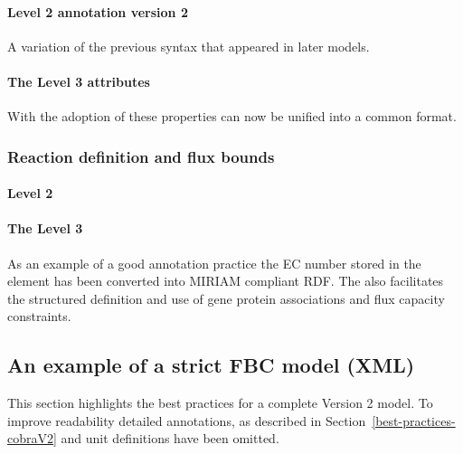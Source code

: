 \begin{newsection}
\paragraph{\SBML Level 2 \Species annotation version 2}
A variation of the previous syntax that appeared in later models.
%

\paragraph{The \SBML Level 3 \FBC \Species attributes}
With the adoption of \SBML \FBC these \Species properties can now be unified into a common format.
%

\subsubsection*{Reaction definition and flux bounds}
\paragraph{\SBML Level 2 \Reaction}
%

\paragraph{The \SBML Level 3 \FBC \Reaction}

As an example of a good annotation practice the \textsf{EC number} stored in the \Notes element has been converted into MIRIAM compliant RDF. The \FBCPackage also facilitates the structured definition and use of gene protein associations and flux capacity constraints.

%

\newpage
\subsection{An example of a strict FBC model (XML)}
\label{best-practices-V2}
This section highlights the best practices for a complete \FBC Version 2 model. To improve readability detailed annotations, as described in Section~\ref{best-practices-cobraV2} and unit definitions have been omitted.



\end{newsection}
